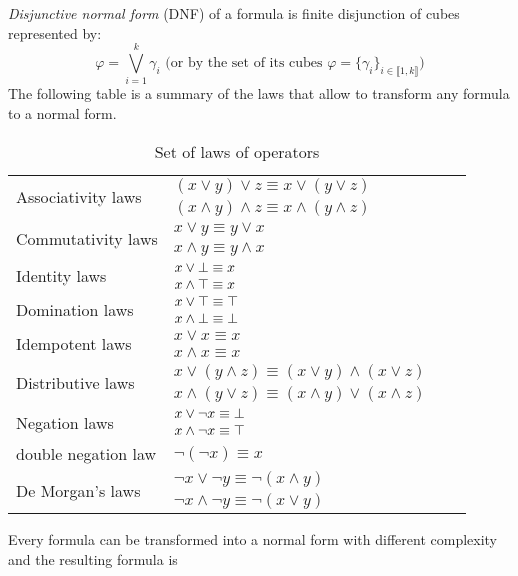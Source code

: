 \emph{Disjunctive normal form} (DNF) of a formula is finite disjunction of cubes represented by:
  $$\varphi = \bigvee_{i=1}^k \gamma_i \text{ (or by the set of its cubes } \varphi = \{\gamma_i\}_{i \in \llbracket 1,k \rrbracket}\text{)}$$
The following table is a summary of the laws that allow to transform any formula to
a normal form.
\begin{table}[!htbp]
 \centering
 \begin{tabular}{lllc}
  \multirow{2}{*}{Associativity laws} & $(x \lor y) \lor z \equiv x \lor (y \lor z)$\\
          & $(x \land y) \land z \equiv x \land (y \land z)$\\
  \hline              
  \multirow{2}{*}{Commutativity laws} & $x \lor y \equiv y \lor x$\\
          & $x \land y \equiv y \land x$\\
  \hline      
  \multirow{2}{*}{Identity laws} & $x \lor \bot \equiv x$\\
           & $x \land \top \equiv x$\\
  \hline        
  \multirow{2}{*}{Domination laws} & $x \lor \top \equiv \top$\\
           &  $x \land \bot \equiv \bot$\\
  \hline        
  \multirow{2}{*}{Idempotent laws} & $x \lor x \equiv x$\\
               & $x \land x \equiv x$\\     
  \hline        
  \multirow{2}{*}{Distributive laws} & $x \lor (y \land z) \equiv (x \lor y) \land (x \lor z)$\\
           & $x \land (y \lor z) \equiv (x \land y) \lor (x \land z)$\\
 \hline        
 \multirow{2}{*}{Negation laws}  & $x \lor \neg x \equiv \bot$\\
        & $x \land \neg x \equiv \top$\\
  \hline
   double negation law & $\neg (\neg x) \equiv x$ \\
  \hline
  \multirow{2}{*}{De Morgan's laws} & $\neg x \lor \neg y \equiv \neg (x \land y)$\\
            &  $\neg x \land \neg y \equiv \neg (x \lor y)$\\
 \end{tabular}
 \caption{Set of laws of operators}
 \label{tab:laws}
\end{table}
Every formula can be transformed into a normal form with different complexity and the resulting formula is 

